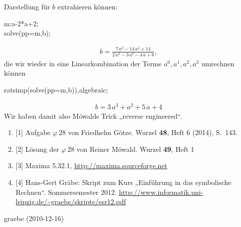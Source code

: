 \documentclass[11pt,a4paper]{article}
\begin{document}
Darstellung für $b$ extrahieren können:
\begin{code}
  m:a-2*a+2;\\
  solve(pp=m,b);
\end{code}
\begin{gather*}
  b = \frac{7\,a^3-14\,a^2+14}{2\,a^3-3\,a^2-4\,a+6},
\end{gather*}
die wir wieder in eine Linearkombination der Terme $a^0,a^1,a^2,a^3$ umrechnen
können
\begin{code}
  ratsimp(solve(pp=m,b)),algebraic;
\end{code}
\begin{gather*}
  b = 3\,a^3+a^2+5\,a+4
\end{gather*}
Wir haben damit also Möwalds Trick „reverse engineered“.

\begin{enumerate}
\item{[1]} Aufgabe $\varphi\ 28$ von Friedhelm Götze. Wurzel {\bf 48}, Heft 6
  (2014), S.\ 143.
\item{[2]} Lösung der $\varphi\ 28$ von Reiner Möwald. Wurzel {\bf 49}, Heft 1
\item{[3]} Maxima 5.32.1, \url{http://maxima.sourceforge.net}
\item{[4]} Hans-Gert Gräbe: Skript zum Kurs „Einführung in das symbolische
  Rechnen“.  Sommersemester 2012.
  \url{http://www.informatik.uni-leipzig.de/~graebe/skripte/esr12.pdf}
\end{enumerate}


\begin{attribution}
graebe (2010-12-16)
\end{attribution}
\end{document}

